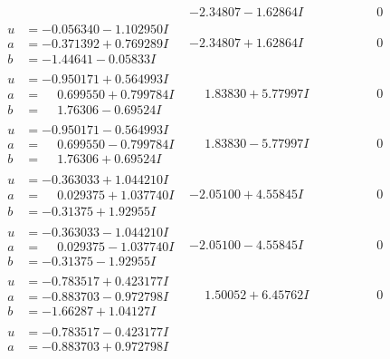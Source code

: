 \documentclass[1p]{elsarticle_modified}
\theoremstyle{definition}
\begin{document}
$$\begin{array}{c|c|c}
 & -2.34807 - 1.62864 I & \phantom{-0.000000 } 0 \\ \hline\begin{aligned}
u &= -0.056340 - 1.102950 I \\
a &= -0.371392 + 0.769289 I \\
b &= -1.44641 - 0.05833 I\end{aligned}
 & -2.34807 + 1.62864 I & \phantom{-0.000000 } 0 \\ \hline\begin{aligned}
u &= -0.950171 + 0.564993 I \\
a &= \phantom{-}0.699550 + 0.799784 I \\
b &= \phantom{-}1.76306 - 0.69524 I\end{aligned}
 & \phantom{-}1.83830 + 5.77997 I & \phantom{-0.000000 } 0 \\ \hline\begin{aligned}
u &= -0.950171 - 0.564993 I \\
a &= \phantom{-}0.699550 - 0.799784 I \\
b &= \phantom{-}1.76306 + 0.69524 I\end{aligned}
 & \phantom{-}1.83830 - 5.77997 I & \phantom{-0.000000 } 0 \\ \hline\begin{aligned}
u &= -0.363033 + 1.044210 I \\
a &= \phantom{-}0.029375 + 1.037740 I \\
b &= -0.31375 + 1.92955 I\end{aligned}
 & -2.05100 + 4.55845 I & \phantom{-0.000000 } 0 \\ \hline\begin{aligned}
u &= -0.363033 - 1.044210 I \\
a &= \phantom{-}0.029375 - 1.037740 I \\
b &= -0.31375 - 1.92955 I\end{aligned}
 & -2.05100 - 4.55845 I & \phantom{-0.000000 } 0 \\ \hline\begin{aligned}
u &= -0.783517 + 0.423177 I \\
a &= -0.883703 - 0.972798 I \\
b &= -1.66287 + 1.04127 I\end{aligned}
 & \phantom{-}1.50052 + 6.45762 I & \phantom{-0.000000 } 0 \\ \hline\begin{aligned}
u &= -0.783517 - 0.423177 I \\
a &= -0.883703 + 0.972798 I \\

\end{aligned}
\end{array}$$
\end{document}
